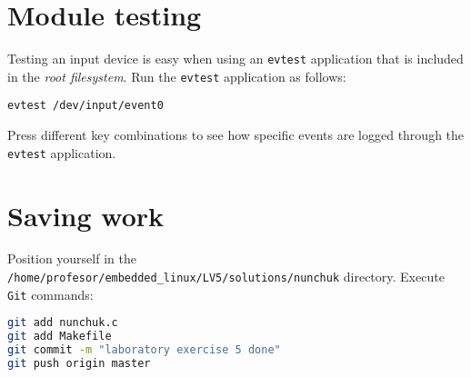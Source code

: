 \documentclass[11pt]{article}
\begin{document}
\section{Module testing}
Testing an input device is easy when using an \texttt{evtest} application that
 is included in the \textit{root filesystem}. Run the \texttt{evtest}
 application as follows:
\begin{lstlisting}
evtest /dev/input/event0
\end{lstlisting}
Press different key combinations to see how specific events are logged through
 the \texttt{evtest} application.

\section{Saving work}
Position yourself in the
\texttt{/home/profesor/embedded\_linux/LV5/solutions/nunchuk} directory.
Execute \texttt{Git} commands:
\begin{lstlisting}[language=bash]
git add nunchuk.c
git add Makefile
git commit -m "laboratory exercise 5 done"
git push origin master
\end{lstlisting}
\end{document}
